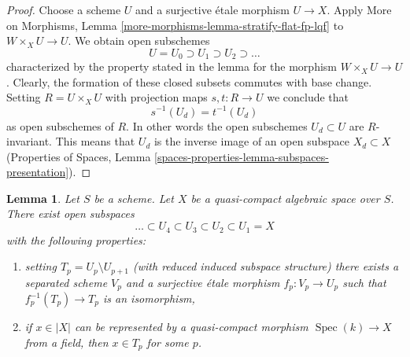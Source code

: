 \documentclass{stacks-project}
\theoremstyle{plain}
\newtheorem{lemma}[subsection]{Lemma}
\theoremstyle{definition}
\theoremstyle{remark}
\numberwithin{equation}{subsection}
\def\Spec{\mathop{\mathrm{Spec}}}
\begin{document}
\begin{proof}
Choose a scheme $U$ and a surjective \'etale morphism $U \to X$. Apply
More on Morphisms, Lemma \ref{more-morphisms-lemma-stratify-flat-fp-lqf}
to $W \times_X U \to U$. We obtain open subschemes
$$
U = U_0 \supset U_1 \supset U_2 \supset \ldots
$$
characterized by the property stated in the lemma for the morphism
$W \times_X U \to U$. Clearly, the formation of these closed subsets commutes
with base change. Setting $R = U \times_X U$ with projection maps
$s, t : R \to U$ we conclude that
$$
s^{-1}(U_d) = t^{-1}(U_d)
$$
as open subschemes of $R$. In other words the open subschemes $U_d \subset U$
are $R$-invariant. This means that $U_d$ is the inverse image of an
open subspace $X_d \subset X$
(Properties of Spaces, Lemma
\ref{spaces-properties-lemma-subspaces-presentation}).
\end{proof}

\begin{lemma}
\label{lemma-filter-quasi-compact}
Let $S$ be a scheme. Let $X$ be a quasi-compact algebraic space
over $S$. There exist open subspaces
$$
\ldots \subset U_4 \subset U_3 \subset U_2 \subset U_1 = X
$$
with the following properties:
\begin{enumerate}
\item setting $T_p = U_p \setminus U_{p + 1}$ (with reduced induced subspace
structure) there exists a separated scheme $V_p$ and a surjective \'etale
morphism $f_p : V_p \to U_p$ such that $f_p^{-1}(T_p) \to T_p$ is an
isomorphism,
\item if $x \in |X|$ can be represented by a quasi-compact morphism
$\Spec(k) \to X$ from a field, then $x \in T_p$ for some $p$.
\end{enumerate}
\end{lemma}
\end{document}
